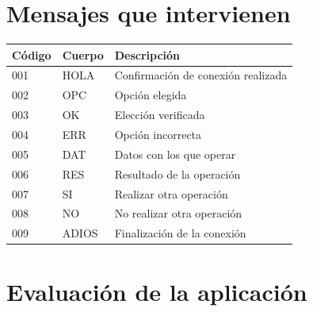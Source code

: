 \documentclass[a4paper, 11pt]{article}
\theoremstyle{plain}
\begin{document}
\section{Mensajes que intervienen}

\begin{table}[]
\centering
\label{my-label}
\begin{tabular}{lll}
\hline
\multicolumn{1}{|l|}{Código} & \multicolumn{1}{l|}{Cuerpo} & \multicolumn{1}{l|}{Descripción}   \\ \hline
001                          & HOLA                        & Confirmación de conexión realizada \\
002                          & OPC                         & Opción elegida                     \\
003                          & OK                          & Elección verificada                \\
004                          & ERR                         & Opción incorrecta                  \\
005                          & DAT                         & Datos con los que operar           \\
006                          & RES                         & Resultado de la operación          \\
007                          & SI                          & Realizar otra operación            \\
008                          & NO                          & No realizar otra operación         \\
009                          & ADIOS                       & Finalización de la conexión       
\end{tabular}
\end{table}

\section{Evaluación de la aplicación}
\end{document}

